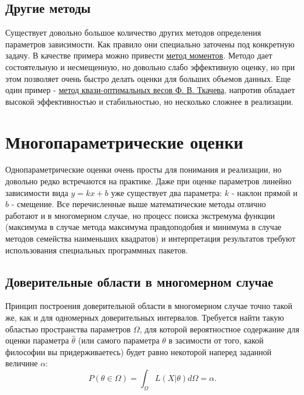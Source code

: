 
\subsection{Другие методы}

    Существует довольно большое количество других методов определения
параметров зависимости. Как правило они специально заточены под
конкретную задачу. В качестве примера можно привести
\href{https://ru.wikipedia.org/wiki/\%D0\%9C\%D0\%B5\%D1\%82\%D0\%BE\%D0\%B4_\%D0\%BC\%D0\%BE\%D0\%BC\%D0\%B5\%D0\%BD\%D1\%82\%D0\%BE\%D0\%B2}{метод
моментов}. Методо дает состоятельную и несмещенную, но довольно слабо
эффективную оценку, но при этом позволяет очень быстро делать оценки для
больших объемов данных. Еще один пример -
\href{https://arxiv.org/abs/physics/0604127}{метод квази-оптимальных
весов Ф. В. Ткачева}, напротив обладает высокой эффективностью и
стабильностью, но несколько сложнее в реализации.

\section{Многопараметрические оценки}

    Однопараметрические оценки очень просты для понимания и реализации, но
довольно редко встречаются на практике. Даже при оценке параметров
линейно зависимости вида $y = k x + b$ уже существует два параметра:
$k$ - наклон прямой и $b$ - смещение. Все перечисленные выше
математические методы отлично работают и в многомерном случае, но
процесс поиска экстремума функции (максимума в случае метода максимума
правдоподобия и минимума в случае методов семейства наименьших
квадратов) и интерпретация результатов требуют использования специальных
программных пакетов.

    
\subsection{Доверительные области в многомерном случае}

    Принцип построения доверительной области в многомерном случае точно
такой же, как и для одномерных доверительных интервалов. Требуется найти
такую областью пространства параметров $\Omega$, для которой
вероятностное содержание для оценки параметра $\hat \theta$ (или
самого параметра $\theta$ в засимости от того, какой философии вы
придерживаетесь) будет равно некоторой наперед заданной величине
$\alpha$: \begin{equation}
  P(\theta \in \Omega) = \int_\Omega{L(X | \theta)}d\Omega = \alpha.
\end{equation}

